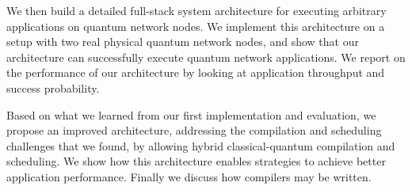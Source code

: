 We then build a detailed full-stack system architecture for executing arbitrary applications on quantum network nodes.
We implement this architecture on a setup with two real physical quantum network nodes, and show that our architecture can successfully execute quantum network applications.
We report on the performance of our architecture by looking at application throughput and success probability.

Based on what we learned from our first implementation and evaluation, we propose an improved architecture, addressing the compilation and scheduling challenges that we found, by allowing hybrid classical-quantum compilation and scheduling.
We show how this architecture enables strategies to achieve better application performance.
Finally we discuss how compilers may be written.
